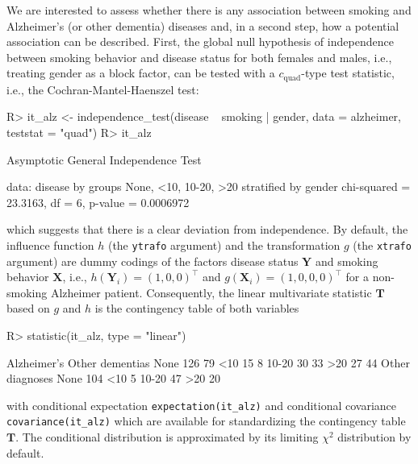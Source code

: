 \documentclass{article}
\newcommand{\Rcmd}[1]{\texttt{#1}}
\newcommand{\X}{\mathbf{X}}
\newcommand{\Y}{\mathbf{Y}}
\newcommand{\T}{\mathbf{T}}
\newenvironment{Schunk}{}{}
\begin{document}
We are interested to assess whether there is any association
between smoking and Alzheimer's (or other dementia) diseases and, in a
second step, how a potential association can be described. First,
the global null hypothesis of independence between smoking behavior and disease
status for both females and males, i.e., treating gender as a
block factor, can be tested with a $c_\text{quad}$-type test statistic, i.e., the 
Cochran-Mantel-Haenszel test:
\begin{Schunk}
\begin{Sinput}
R> it_alz <- independence_test(disease ~ 
       smoking | gender, data = alzheimer, 
       teststat = "quad")
R> it_alz
\end{Sinput}
\begin{Soutput}
	Asymptotic General Independence Test

data:  disease by
	 groups None, <10, 10-20, >20 
	 stratified by gender 
chi-squared = 23.3163, df = 6, p-value =
0.0006972
\end{Soutput}
\end{Schunk}
which suggests that there is a clear deviation from independence. 
By default, the influence function $h$ (the \Rcmd{ytrafo} argument)
and the transformation $g$ (the \Rcmd{xtrafo} argument)
are dummy codings of the factors disease status $\Y$ and smoking behavior $\X$, 
i.e., $h(\Y_i) = (1, 0, 0)^\top$ 
and $g(\X_i) = (1, 0, 0 ,0)^\top$ for a non-smoking Alzheimer patient. 
Consequently, the linear multivariate statistic $\T$ based on $g$ and $h$ 
is the contingency table of both variables 
\begin{Schunk}
\begin{Sinput}
R> statistic(it_alz, type = "linear")
\end{Sinput}
\begin{Soutput}
      Alzheimer's Other dementias
None          126              79
<10            15               8
10-20          30              33
>20            27              44
      Other diagnoses
None              104
<10                 5
10-20              47
>20                20
\end{Soutput}
\end{Schunk}
with conditional expectation \Rcmd{expectation(it\_alz)} and conditional
covariance \Rcmd{covariance(it\_alz)} which are available for standardizing
the contingency table $\T$. The conditional distribution is approximated by
its limiting $\chi^2$ distribution by default. 
\end{document}

